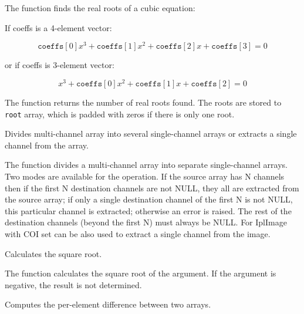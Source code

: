 The function finds the real roots of a cubic equation:

If coeffs is a 4-element vector:

\[
\texttt{coeffs}[0] x^3 + \texttt{coeffs}[1] x^2 + \texttt{coeffs}[2] x + \texttt{coeffs}[3] = 0
\]

or if coeffs is 3-element vector:

\[
x^3 + \texttt{coeffs}[0] x^2 + \texttt{coeffs}[1] x + \texttt{coeffs}[2] = 0
\]

The function returns the number of real roots found. The roots are
stored to \texttt{root} array, which is padded with zeros if there is
only one root.

Divides multi-channel array into several single-channel arrays or extracts a single channel from the array.


\begin{description}
\end{description}

The function divides a multi-channel array into separate
single-channel arrays. Two modes are available for the operation. If the
source array has N channels then if the first N destination channels
are not NULL, they all are extracted from the source array;
if only a single destination channel of the first N is not NULL, this
particular channel is extracted; otherwise an error is raised. The rest
of the destination channels (beyond the first N) must always be NULL. For
IplImage  with COI set can be also used to extract a single
channel from the image.


Calculates the square root.


\begin{description}
\end{description}


The function calculates the square root of the argument. If the argument is negative, the result is not determined.

Computes the per-element difference between two arrays.

